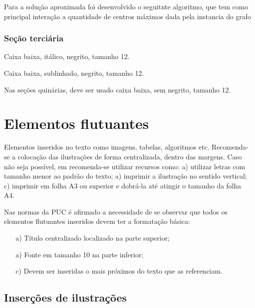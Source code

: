 Para a solução aproximada foi desenvolvido o seguitnte algoritmo, que tem como principal 
interação a quantidade de centros máximos dada pela instancia do grafo
\subsubsection{\esp Seção terciária}

Caixa baixa, itálico, negrito, tamanho 12.


Caixa baixa, sublinhado, negrito, tamanho 12.


Nas seções quinárias, deve ser usado caixa baixa, sem negrito, tamanho 12.

\section{\esp Elementos flutuantes}

Elementos inseridos no texto como imagens, tabelas, algoritmos etc.
Recomenda-se a colocação das ilustrações de forma centralizada, dentro das margens.
Caso não seja possível, em  recomenda-se utilizar recursos como:
a) utilizar letras com tamanho menor ao padrão do texto; a) imprimir a ilustração no sentido vertical;
c) imprimir em folha A3 ou superior e dobrá-la até atingir o tamanho da folha A4.

Nas normas da PUC é afirmado a necessidade de se observar que todos os elementos flutuantes inseridos devem ter a formatação básica:

\begin{enumerate}
	\item [a)] Título centralizado localizado na parte superior;
	\item [a)] Fonte em tamanho 10 na parte inferior;
	\item [c)] Devem ser inseridas o mais próximos do texto que as referenciam.
\end{enumerate}


\subsection{\esp Inserções de ilustrações}

